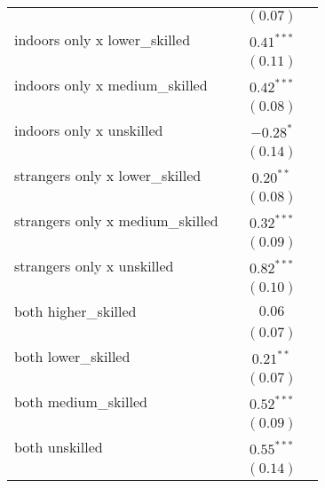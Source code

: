 \begin{table}
\begin{center}
\begin{tabular}{l c c c}
                                 &               & $(0.07)$      &               \\
indoors only x lower\_skilled    &               & $0.41^{***}$  &               \\
                                 &               & $(0.11)$      &               \\
indoors only x medium\_skilled   &               & $0.42^{***}$  &               \\
                                 &               & $(0.08)$      &               \\
indoors only x unskilled         &               & $-0.28^{*}$   &               \\
                                 &               & $(0.14)$      &               \\
strangers only x lower\_skilled  &               & $0.20^{**}$   &               \\
                                 &               & $(0.08)$      &               \\
strangers only x medium\_skilled &               & $0.32^{***}$  &               \\
                                 &               & $(0.09)$      &               \\
strangers only x unskilled       &               & $0.82^{***}$  &               \\
                                 &               & $(0.10)$      &               \\
both higher\_skilled             &               & $0.06$        &               \\
                                 &               & $(0.07)$      &               \\
both lower\_skilled              &               & $0.21^{**}$   &               \\
                                 &               & $(0.07)$      &               \\
both medium\_skilled             &               & $0.52^{***}$  &               \\
                                 &               & $(0.09)$      &               \\
both unskilled                   &               & $0.55^{***}$  &               \\
                                 &               & $(0.14)$      &               \\

\end{tabular}
\end{center}
\end{table}
